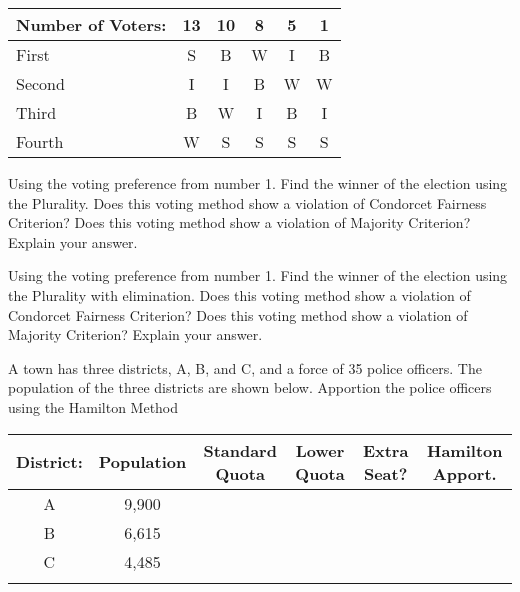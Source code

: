 \documentclass[11pt,epsfig]{article}
\begin{document}
\newpage

 \begin{center}
 \begin{tabular}{ | l | c | c  |  c |  c | c |}
   \hline
   Number of Voters: & 13 & 10 & 8 & 5 & 1\\ \hline
   First & S & B & W & I & B \\ \hline
   Second & I & I & B & W & W \\ \hline
   Third & B & W & I & B & I \\ \hline
   Fourth & W & S & S & S & S \\ \hline
   \end{tabular}
  \end{center}
  

\begin{problem}{25}
Using the voting preference from number 1. Find the winner of the election using the Plurality. Does this voting method show a violation of Condorcet Fairness Criterion? Does this voting method show a violation of Majority Criterion? Explain your answer.

\vfill
\end{problem}

  
\begin{problem}{25}
Using the voting preference from number 1. Find the winner of the election using the Plurality with elimination. Does this voting method show a violation of Condorcet Fairness Criterion? Does this voting method show a violation of Majority Criterion? Explain your answer.

\vfill
\end{problem}

\newpage

\begin{problem}{20}
A town has three districts, A, B, and C, and a force of 35 police officers. The population of the three districts are shown below. Apportion the police officers using the Hamilton Method
 \begin{center}
 \begin{tabular}{ | c | c | c | c | c | c |}
   \hline
   District: & Population & Standard Quota & Lower Quota & Extra Seat? & Hamilton Apport.\\ \hline
   A & 9,900 &  &  &  &  \\ \hline
   B & 6,615 &  &  &  &  \\ \hline
   C & 4,485 &  &  &  &  \\ \hline
    &  &  &  &  &  \\ \hline
   \end{tabular}
  \end{center}

\vfill
\end{problem}
\end{document}

